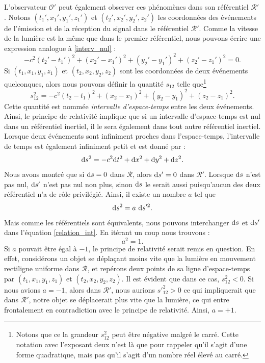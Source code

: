 		L'observateur $\mathscr{O}'$ peut également observer ces phénomènes dans son référentiel $\mathscr{R}'$. Notons $(t_1',x_1',y_1',z_1')$ et $(t_2',x_2',y_2',z_2')$ les coordonnées des événements de l'émission et de la réception du signal dans le référentiel $\mathscr{R}'$. Comme la vitesse de la lumière est la même que dans le premier référentiel, nous pouvons écrire une expression analogue à \eqref{interv_nul} :
		\begin{equation}
			-c^2(t_2'-t_1')^2+(x_2'-x_1')^2+(y_2'-y_1')^2+(z_2'-z_1')^2=0.
		\end{equation}
		Si $(t_1,x_1,y_1,z_1)$ et $(t_2,x_2,y_2,z_2)$ sont les coordonnées de deux événements quelconques, alors nous pouvons définir la quantité $s_{12}$ telle que\footnote{Notons que ce la grandeur $s_{12}^2$ peut être négative malgré le carré. Cette notation avec l'exposant deux n'est là que pour rappeler qu'il s'agit d'une forme quadratique, mais pas qu'il s'agit d'un nombre réel élevé au carré.}
		\begin{equation}
			s_{12}^2=-c^2(t_2-t_1)^2+(x_2-x_1)^2+(y_2-y_1)^2+(z_2-z_1)^2. \label{intervalle}
		\end{equation}
		Cette quantité est nommée \emph{intervalle d'espace-temps} entre les deux événements. Ainsi, le principe de relativité implique que si un intervalle d'espace-temps est nul dans un référentiel inertiel, il le sera également dans tout autre référentiel inertiel. Lorsque deux événements sont infiniment proches dans l'espace-temps, l'intervalle de temps est également infiniment petit et est donné par :
		\begin{equation}
			\mathrm{d} s^2=-c^2\mathrm{d} t^2 + \mathrm{d} x^2+\mathrm{d} y^2+\mathrm{d} z^2.
		\end{equation}
		Nous avons montré que si $\mathrm{d} s=0$ dans $\mathscr{R}$, alors $\mathrm{d} s'=0$ dans $\mathscr{R}'$. Lorsque $\mathrm{d} s$ n'est pas nul, $\mathrm{d} s'$ n'est pas nul non plus, sinon $\mathrm{d} s$ le serait aussi puisqu'aucun des deux référentiel n'a de rôle privilégié. Ainsi, il existe un nombre $a$ tel que
		\begin{equation}
			\mathrm{d} s^2 = a\  \mathrm{d} s'^2. \label{relation_int}
		\end{equation}
		Mais comme les référentiels sont équivalents, nous pouvons interchanger $\mathrm{d} s$ et $\mathrm{d} s'$ dans l'équation \eqref{relation_int}. En itérant un coup nous trouvons :
		\begin{equation}
			a^2=1.
		\end{equation}
		Si $a$ pouvait être égal à $-1$, le principe de relativité serait remis en question. En effet, considérons un objet se déplaçant moins vite que la lumière en mouvement rectiligne uniforme dans $\mathscr{R}$, et repérons deux points de sa ligne d'espace-temps par $(t_1,x_1,y_1,z_1)$ et $(t_2,x_2,y_2,z_2)$. Il est évident que dans ce cas, $s_{12}^2<0$. Si nous avions $a=-1$, alors dans $\mathscr{R}'$, nous aurions $s'_{12}^2>0$ ce qui impliquerait que dans $\mathscr{R}'$, notre objet se déplacerait plus vite que la lumière, ce qui entre frontalement en contradiction avec le principe de relativité. Ainsi, $a=+1$. 

